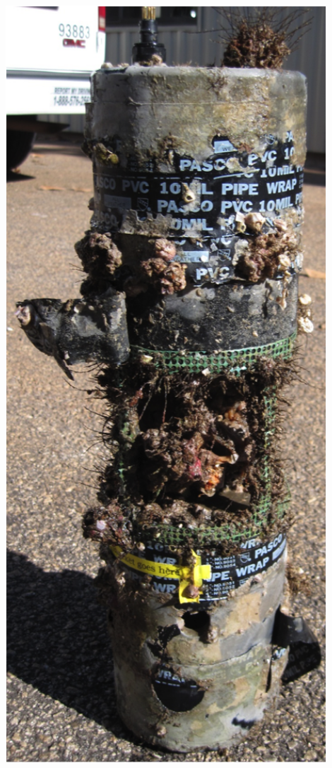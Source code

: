 \or	%
    \noindent
    \begin{minipage}[t]{0.5\textwidth}
    \centering
    \raisebox{\dimexpr \topskip-\height}
    {
       \includegraphics[width=0.9\textwidth]{figs/Foul.png}
    }
    \end{minipage}
